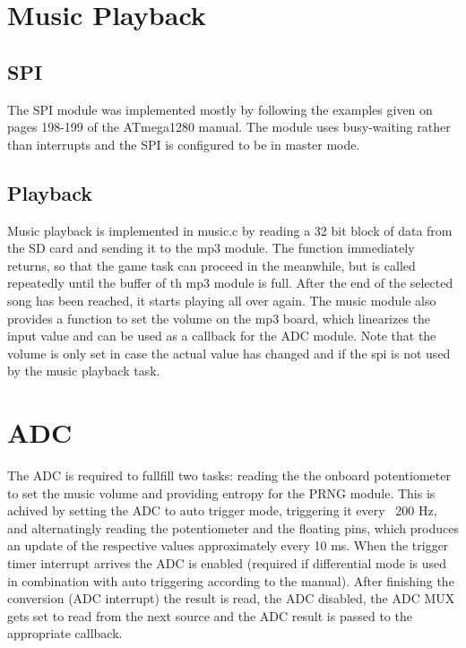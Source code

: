 \documentclass[12pt,a4paper,titlepage,oneside]{article}
\begin{document}
\section{Music Playback}

\subsection{SPI}

The SPI module was implemented mostly by following the examples given on
pages 198-199 of the ATmega1280 manual. The module uses busy-waiting rather
than interrupts and the SPI is configured to be in master mode.

\subsection{Playback}

Music playback is implemented in music.c by reading a 32 bit block of data from the SD 
card and sending it to the mp3 module. The function immediately returns, so
that the game task can proceed in the meanwhile, but is called repeatedly
until the buffer of th mp3 module is full. After the end of the selected song
has been reached, it starts playing all over again. The music module also 
provides a function to set the volume on the mp3 board, which linearizes the
input value and can be used as a callback for the ADC module. Note that the
volume is only set in case the actual value has changed and if the spi is not
used by the music playback task.

\section{ADC}

The ADC is required to fullfill two tasks: reading the the onboard
potentiometer to set the music volume and providing entropy for the PRNG
module. This is achived by setting the ADC to auto trigger mode, triggering
it every ~200 Hz, and alternatingly reading the potentiometer and the floating
pins, which produces an update of the respective values approximately every
10 ms. When the trigger timer interrupt arrives the ADC is enabled (required
if differential mode is used in combination with auto triggering according
to the manual). After finishing the conversion (ADC interrupt) the result
is read, the ADC disabled, the ADC MUX gets set to read from the next source
and the ADC result is passed to the appropriate callback.
\end{document}
